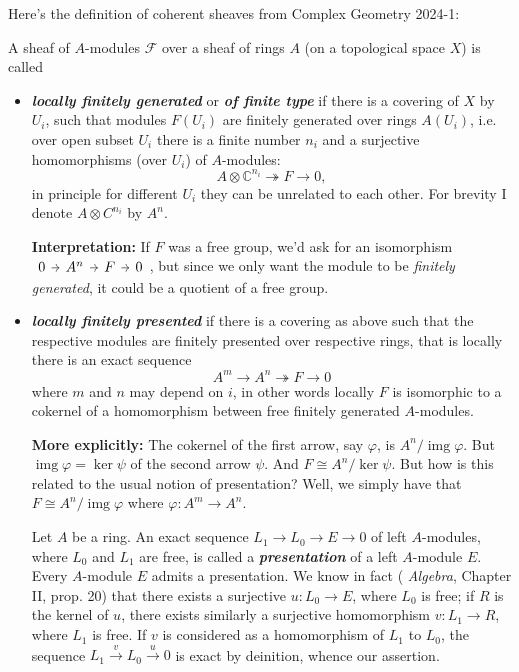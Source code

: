 Here's the definition of coherent sheaves from Complex Geometry 2024-1:

\begin{defn}A sheaf of $A$-modules $\mathcal{F}$ over a sheaf of rings $A$ (on a topological space $X$) is called
	\begin{itemize}
		\item \textbf{\textit{locally finitely generated}} or \textbf{\textit{of finite type}} if there is a covering of $X$ by $U_i$, such that modules $F(U_i)$ are finitely generated over rings $A(U_i)$, i.e. over open subset $U_i$ there is a finite number $n_i$ and a surjective homomorphisms (over $U_i$) of $A$-modules: 
		\[A \otimes \mathbb{C}^{n_i}\twoheadrightarrow F\to 0,\] in principle for different $U_i$ they can be unrelated to each other.   For brevity I denote $A \otimes C^{n_i}$ by $A^n$.

		{\color{5}\bfseries Interpretation:}\hspace{.5em} If $ F$ was a free group, we'd ask for an isomorphism  $\begin{tikzcd}[column sep=tiny]
			0\arrow[r]&A^n\arrow[r]&F\arrow[r]&0
		\end{tikzcd}$, but since we only want the module to be \textit{finitely generated}, it could be a quotient of a free group.
		
		\item \textbf{\textit{locally finitely presented}} if there is a covering as above such that the respective modules are finitely presented over respective rings, that is  locally there is an exact sequence 
		\[A^m\to A^n\twoheadrightarrow F\to 0\]
		where $m$ and $n$ may depend on $i$, in other words locally $F$ is isomorphic to a cokernel of a homomorphism between free finitely generated $A$-modules.

		{\color{5}\bfseries More explicitly:}\hspace{.5em} The cokernel of the first arrow, say $\varphi$, is $A^n/\operatorname{img} \varphi$. But $\operatorname{img} \varphi=\ker \psi$ of the second arrow $\psi$. And $F\cong A^n/\ker \psi$. {\color{7}But how is this related to the usual notion of presentation?} Well, we simply have that $F\cong A^n/\operatorname{img} \varphi$ where $\varphi:A^m\to A^n$.

\begin{remark}
	Let $A$ be a ring. An exact sequence  $L_1\to L_0\to E\to 0$ of left $A$-modules, where $L_0$ and $L_1$ are free, is called a \textit{\textbf{presentation}} of a left $A$-module $E$. Every $A$-module $E$ admits a presentation. We know in fact ( \textit{Algebra}, Chapter II, prop. 20) that there exists a surjective $u:L_0\to E$, where $L_0$ is free; if $R$ is the kernel of $u$, there exists similarly a surjective homomorphism $v:L_1\to R$, where $L_1$ is free. If $v$ is considered as a homomorphism of $L_1$ to $L_0$, the sequence $L_1\xrightarrow{v}L_0\xrightarrow{u}0$ is exact by deinition, whence our assertion.
\end{remark}


\end{itemize}
\end{defn}
